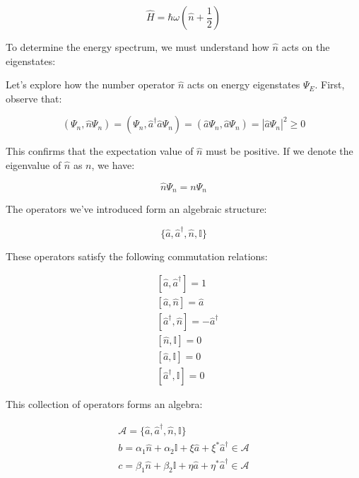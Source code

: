 \documentclass[italian]{HKNdocument}
\begin{document}
\begin{equation}
\hat{H} = \hbar\omega\left(\hat{n} + \frac{1}{2}\right) \label{eq:5.13}
\end{equation}

To determine the energy spectrum, we must understand how $\hat{n}$ acts on the eigenstates:


Let's explore how the number operator $\hat{n}$ acts on energy eigenstates $\Psi_E$. First, observe that:

\begin{equation}
(\Psi_n, \hat{n}\Psi_n) = (\Psi_n, \hat{a}^\dagger\hat{a}\Psi_n) = (\hat{a}\Psi_n, \hat{a}\Psi_n) = |\hat{a}\Psi_n|^2 \geq 0 \label{eq:5.14}
\end{equation}

This confirms that the expectation value of $\hat{n}$ must be positive. If we denote the eigenvalue of $\hat{n}$ as $n$, we have:

\begin{equation}
\hat{n}\Psi_n = n\Psi_n \label{eq:5.15}
\end{equation}

The operators we've introduced form an algebraic structure:

\begin{equation}
\{\hat{a}, \hat{a}^\dagger, \hat{n}, \mathbb{I}\} \label{eq:5.16}
\end{equation}

These operators satisfy the following commutation relations:

\begin{align}
&[\hat{a}, \hat{a}^\dagger] = 1 \\
&[\hat{a}, \hat{n}] = \hat{a} \\
&[\hat{a}^\dagger, \hat{n}] = -\hat{a}^\dagger \label{eq:5.17} \\
&[\hat{n}, \mathbb{I}] = 0 \\
&[\hat{a}, \mathbb{I}] = 0 \\
&[\hat{a}^\dagger, \mathbb{I}] = 0
\end{align}

This collection of operators forms an algebra:

\begin{gather}
\mathcal{A} = \{\hat{a}, \hat{a}^\dagger, \hat{n}, \mathbb{I}\} \label{eq:5.18} \\
b = \alpha_1\hat{n} + \alpha_2\mathbb{I} + \xi\hat{a} + \xi^*\hat{a}^\dagger \in \mathcal{A} \\
c = \beta_1\hat{n} + \beta_2\mathbb{I} + \eta\hat{a} + \eta^*\hat{a}^\dagger \in \mathcal{A} \label{eq:5.19}
\end{gather}
\end{document}
